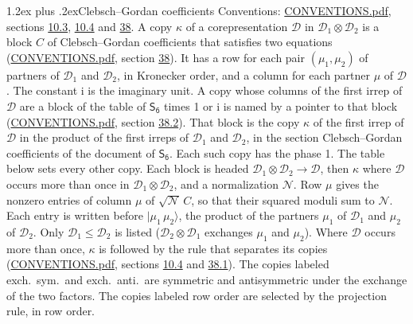 \documentclass[10pt,a4paper]{article}
\makeatletter
\renewcommand\section{\@startsection{section}{1}{\z@}{-3ex plus -1ex minus -.2ex}%
  {1.2ex plus .2ex}{\normalfont\large\sffamily\bfseries\color{parttitle}}}
\numberwithin{equation}{section}
\newcommand{\grp}[1]{\mathsf{#1}}
\newcommand{\iunit}{\mathrm{i}}
\newcommand{\irrprod}{\otimes}
\newcommand{\mult}{\kappa}
\newcommand{\intx}{\mu}
\newcommand{\cgnorm}{\mathcal{N}}
\newcommand{\prodket}[2]{\lvert {#1}\,{#2}\rangle}
\makeatother
\begin{document}
\section{Clebsch--Gordan coefficients}\label{s:clebsch_gordan}
Conventions: \href{../../CONVENTIONS.pdf}{CONVENTIONS.pdf}, sections \href{../../../rotation/CONVENTIONS.pdf\#conv.10.3}{10.3}, \href{../../../rotation/CONVENTIONS.pdf\#conv.10.4}{10.4} and \href{../../CONVENTIONS.pdf\#conv.38}{38}.
\leavevmode\label{n:index.copy}\label{n:matrix.cg.stored}A copy $\mult$ of a corepresentation $\mathcal{D}$ in $\mathcal{D}_1\irrprod\mathcal{D}_2$ is a block $C$ of Clebsch--Gordan coefficients that satisfies two equations (\href{../../CONVENTIONS.pdf}{CONVENTIONS.pdf}, section \href{../../CONVENTIONS.pdf\#conv.38}{38}). \label{n:index.cg}It has a row for each pair $(\intx_1, \intx_2)$ of partners of $\mathcal{D}_1$ and $\mathcal{D}_2$, in Kronecker order, and a column for each partner $\intx$ of $\mathcal{D}$.
The constant $\iunit$ is the imaginary unit.
A copy whose columns of the first irrep of $\mathcal{D}$ are a block of the table of $\grp{S_{6}}$ times 1 or $\iunit$ is named by a pointer to that block (\href{../../CONVENTIONS.pdf}{CONVENTIONS.pdf}, section \href{../../CONVENTIONS.pdf\#conv.38.2}{38.2}). That block is the copy $\mult$ of the first irrep of $\mathcal{D}$ in the product of the first irreps of $\mathcal{D}_1$ and $\mathcal{D}_2$, in the section Clebsch--Gordan coefficients of the document of \href{../../../rotation/data/pdf/S6.pdf}{$\grp{S_{6}}$}. Each such copy has the phase 1. The table below sets every other copy.
Each block is headed $\mathcal{D}_1\irrprod\mathcal{D}_2\to\mathcal{D}$, then $\mult$ where $\mathcal{D}$ occurs more than once in $\mathcal{D}_1\irrprod\mathcal{D}_2$, and a normalization $\cgnorm$. Row $\intx$ gives the nonzero entries of column $\intx$ of $\sqrt{\cgnorm}\,C$, so that their squared moduli sum to $\cgnorm$. \label{n:vector.ket.product}Each entry is written before $\prodket{\intx_1}{\intx_2}$, the product of the partners $\intx_1$ of $\mathcal{D}_1$ and $\intx_2$ of $\mathcal{D}_2$. Only $\mathcal{D}_1 \le \mathcal{D}_2$ is listed ($\mathcal{D}_2\irrprod\mathcal{D}_1$ exchanges $\intx_1$ and $\intx_2$).
Where $\mathcal{D}$ occurs more than once, $\mult$ is followed by the rule that separates its copies (\href{../../CONVENTIONS.pdf}{CONVENTIONS.pdf}, sections \href{../../../rotation/CONVENTIONS.pdf\#conv.10.4}{10.4} and \href{../../CONVENTIONS.pdf\#conv.38.1}{38.1}). \label{n:abbreviation.exchange}The copies labeled exch.\ sym.\ and exch.\ anti.\ are symmetric and antisymmetric under the exchange of the two factors. The copies labeled row order are selected by the projection rule, in row order.
\end{document}

